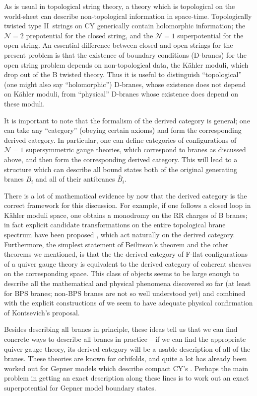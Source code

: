 \documentclass[a4paper,12pt]{amsart}
\numberwithin{equation}{section}
\theoremstyle{plain}
\theoremstyle{definition}
\def\cal{\mathcal}
\def \II {II}
\def\CN{{\cal N}}
\begin{document}
As is usual in topological string theory, a theory which is
topological on the world-sheet can describe non-topological
information in space-time.  Topologically twisted type \II\ strings on
CY generically contain holomorphic information; the $\CN=2$
prepotential for the closed string, and the $\CN=1$ superpotential for
the open string.  An essential difference between closed and open
strings for the present problem is that the existence of boundary
conditions (D-branes) for the open string problem depends on
non-topological data, the K\"ahler moduli, which drop out of the B
twisted theory.  Thus it is useful to distinguish ``topological''
(one might also say ``holomorphic'') D-branes, whose existence does not
depend on K\"ahler moduli, from ``physical'' D-branes whose existence
does depend on these moduli.

It is important to note that the formalism of the derived category is
general; one can take any ``category'' (obeying certain axioms) and
form the corresponding derived category.  In particular, one can
define categories of configurations of $\CN=1$ supersymmetric gauge
theories, which correspond to branes as discussed above, and then form
the corresponding derived category.  This will lead to a structure
which can describe all bound states both of the original generating
branes $B_i$ and all of their antibranes $\bar B_i$.

There is a lot of mathematical evidence by now that the derived
category is the correct framework for this discussion.  For example,
if one follows a closed loop in K\"ahler moduli space, one obtains a
monodromy on the RR charges of B branes; in fact explicit candidate
transformations on the entire topological brane spectrum have been
proposed \cite{Horja,SeidelThomas}, which act naturally on the derived
category.  Furthermore, the simplest statement of Beilinson's theorem
and the other theorems we mentioned, is that the the derived category
of F-flat configurations of a quiver gauge theory is equivalent to the
derived category of coherent sheaves on the corresponding space.  This
class of objects seems to be large enough to describe all the
mathematical and physical phenomena discovered so far (at least for
BPS branes; non-BPS branes are not so well understood yet) and
combined with the explicit constructions of \cite{DCS,AspLaw,Diac}
we seem to have
adequate physical confirmation of Kontsevich's proposal.

Besides describing all branes in principle, these ideas tell us that
we can find concrete ways to describe all branes in practice -- if we
can find the appropriate quiver gauge theory, its derived category
will be a usable description of all of the branes.  These theories are
known for orbifolds, and quite a lot has already been worked out for
Gepner models which describe compact CY's \cite{DD,GJ,Mayr,Tomas}.
Perhaps the main problem in getting an exact description along these
lines is to work out an exact superpotential for Gepner model boundary
states.
\end{document}
